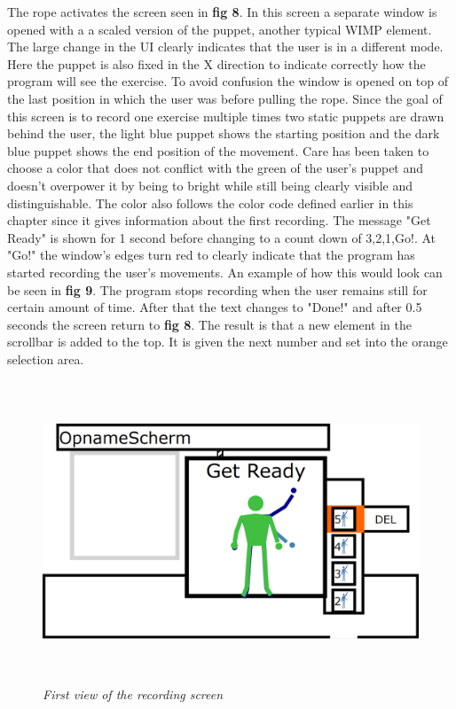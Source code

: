 The rope activates the screen seen in \textbf{ fig 8}. In this screen a separate window is opened with a a scaled version of the puppet, another typical WIMP element. The large change in the UI clearly indicates that the user is in a different mode. Here the puppet is also fixed in the X direction to indicate correctly how the program will see the exercise. To avoid confusion the window is opened on top of the last position in which the user was before pulling the rope. Since the goal of this screen is to record one exercise multiple times two static puppets are drawn behind the user, the light blue puppet shows the starting position and the dark blue puppet shows the end position of the movement. Care has been taken to choose a color that does not conflict with the green of the user's puppet and doesn't overpower it by being to bright while still being clearly visible and distinguishable. The color also follows the color code defined earlier in this chapter since it gives information about the first recording. The message "Get Ready" is shown for 1 second before changing to a count down of 3,2,1,Go!. At "Go!" the window's edges turn red to clearly indicate that the program has started recording the user's movements. An example of how this would look can be seen in \textbf{ fig 9}. The program stops recording when the user remains still for certain amount of time. After that the text changes to "Done!" and after 0.5 seconds the screen return to \textbf{ fig 8}. The result is that a new element in the scrollbar is added to the top. It is given the next number and set into the orange selection area.\\



\begin{figure}[H]
	\begin{center}
		\includegraphics[width=16cm, height=9cm]{figures/4_record_getready.png}
		\caption{\emph{First view of the recording screen}}
		\label{The regular view of the end desing of the UI}
	\end{center}
\end{figure}

